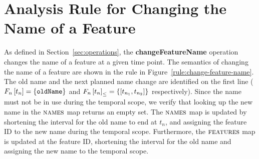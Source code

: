 \section{Analysis Rule for Changing the Name of a Feature}
\label{sec:change-feature-name}

As defined in Section~\ref{sec:operations}, the \textbf{changeFeatureName} operation changes the name of a feature at a given time point. The semantics of changing the name of a feature are shown in the  rule in Figure~\ref{rule:change-feature-name}. The old name and the next planned name change are identified on the first line ($F_n \left[ t_n \right] = \left\{\texttt{oldName}\right\}$ and $\containing{F_n}{t_n} = \set{\interval{t_{n_1}}{t_{n_2}}}$ respectively). Since the name must not be in use during the temporal scope, we verify that looking up the new name in the $\textsc{names}{}$ map returns an empty set. The $\textsc{names}{}$ map is updated by shortening the interval for the old name to end at $t_n$, and assigning the feature ID to the new name during the temporal scope. Furthermore, the $\textsc{features}{}$ map is updated at the feature ID, shortening the interval for the old name and assigning the new name to the temporal scope. 


